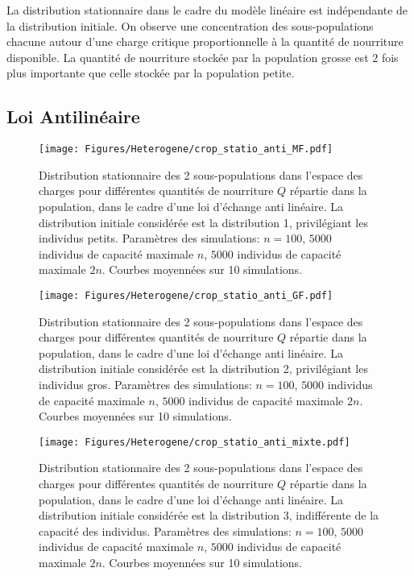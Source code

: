 La distribution stationnaire dans le cadre du modèle linéaire est indépendante de la distribution initiale. On observe une concentration des sous-populations chacune autour d'une charge critique proportionnelle à la quantité de nourriture disponible. La quantité de nourriture stockée par la population grosse est $2$ fois plus importante que celle stockée par la population petite.



\clearpage

\subsection{Loi Antilinéaire}

\begin{figure}[h!]
\centering
\texttt{[image: Figures/Heterogene/crop\_statio\_anti\_MF.pdf]}
\caption{Distribution stationnaire des 2 sous-populations dans l'espace des charges pour différentes quantités de nourriture $Q$ répartie dans la population, dans le cadre d'une loi d'échange anti linéaire. La distribution initiale considérée est la distribution 1, privilégiant les individus petits. Paramètres des simulations: $n=100$, $5000$ individus de capacité maximale $n$, $5000$ individus de capacité maximale $2n$. Courbes moyennées sur 10 simulations.}
\label{statio_anti_MF}
\end{figure}

\begin{figure}[h!]
\centering
\texttt{[image: Figures/Heterogene/crop\_statio\_anti\_GF.pdf]}
\caption{Distribution stationnaire des 2 sous-populations dans l'espace des charges pour différentes quantités de nourriture $Q$ répartie dans la population, dans le cadre d'une loi d'échange anti linéaire. La distribution initiale considérée est la distribution 2, privilégiant les individus gros. Paramètres des simulations: $n=100$, $5000$ individus de capacité maximale $n$, $5000$ individus de capacité maximale $2n$. Courbes moyennées sur 10 simulations.}
\label{statio_anti_GF}
\end{figure}

\begin{figure}[h!]
\centering
\texttt{[image: Figures/Heterogene/crop\_statio\_anti\_mixte.pdf]}
\caption{Distribution stationnaire des 2 sous-populations dans l'espace des charges pour différentes quantités de nourriture $Q$ répartie dans la population, dans le cadre d'une loi d'échange anti linéaire. La distribution initiale considérée est la distribution 3, indifférente de la capacité des individus. Paramètres des simulations: $n=100$, $5000$ individus de capacité maximale $n$, $5000$ individus de capacité maximale $2n$. Courbes moyennées sur 10 simulations.}
\label{statio_anti_mixte}
\end{figure}


